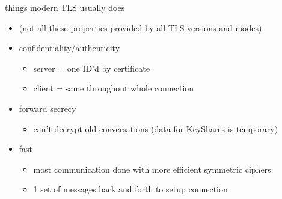 \begin{frame}{things modern TLS usually does}
    \begin{itemize}
        \item (not all these properties provided by all TLS versions and modes)
    \vspace{.5cm}
    \item confidentiality/authenticity 
        \begin{itemize}
        \item server = one ID'd by certificate
        \item client = same throughout whole connection
        \end{itemize}
    \item forward secrecy
        \begin{itemize}
        \item can't decrypt old conversations (data for KeyShares is temporary)
        \end{itemize}
    \item fast
        \begin{itemize}
        \item most communication done with more efficient symmetric ciphers
        \item 1 set of messages back and forth to setup connection
        \end{itemize}
    \end{itemize}
\end{frame}
